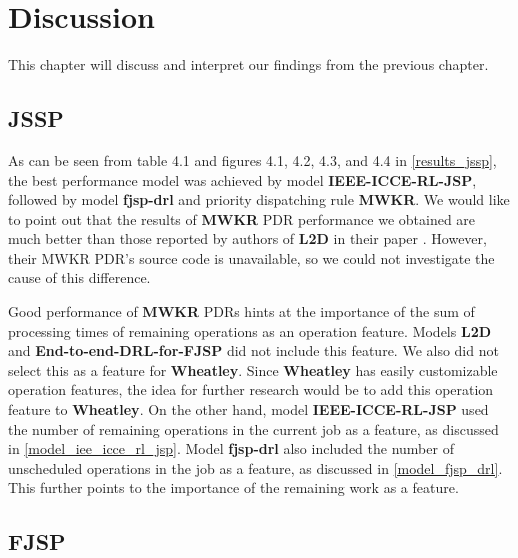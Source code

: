 \chapter{Discussion}

This chapter will discuss and interpret our findings from the previous chapter.

\section{JSSP}
As can be seen from table 4.1 and figures 4.1, 4.2, 4.3, and 4.4 in \ref{results_jssp}, the best performance model was achieved by model \textbf{IEEE-ICCE-RL-JSP}, followed by model \textbf{fjsp-drl} and priority dispatching rule \textbf{MWKR}. We would like to point out that the results of \textbf{MWKR} PDR performance we obtained are much better than those reported by authors of \textbf{L2D} in their paper \cite{zhang2020learning}. However, their MWKR PDR's source code is unavailable, so we could not investigate the cause of this difference.
\par
Good performance of \textbf{MWKR} PDRs hints at the importance of the sum of processing times of remaining operations as an operation feature. Models \textbf{L2D} and \textbf{End-to-end-DRL-for-FJSP} did not include this feature. We also did not select this as a feature for \textbf{Wheatley}. Since \textbf{Wheatley} has easily customizable operation features, the idea for further research would be to add this operation feature to \textbf{Wheatley}. On the other hand, model \textbf{IEEE-ICCE-RL-JSP} used the number of remaining operations in the current job as a feature, as discussed in \ref{model_iee_icce_rl_jsp}. Model \textbf{fjsp-drl} also included the number of unscheduled operations in the job as a feature, as discussed in \ref{model_fjsp_drl}. This further points to the importance of the remaining work as a feature. 

\section{FJSP}
